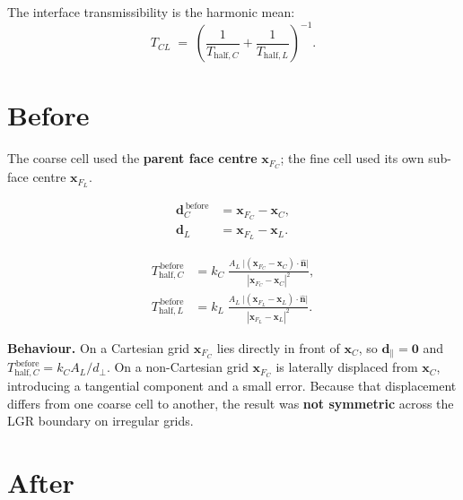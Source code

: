 \documentclass[11pt,a4paper]{article}
\begin{document}
The interface transmissibility is the harmonic mean:
\begin{equation}
  T_{CL} \;=\;
  \left(\frac{1}{T_{\mathrm{half},C}}+\frac{1}{T_{\mathrm{half},L}}\right)^{-1}.
\end{equation}

\section*{Before}

The coarse cell used the \textbf{parent face centre} $\mathbf{x}_{F_C}$;
the fine cell used its own sub-face centre $\mathbf{x}_{F_L}$.

\begin{align}
  \mathbf{d}_C^{\,\text{before}} &= \mathbf{x}_{F_C} - \mathbf{x}_C, \\[6pt]
  \mathbf{d}_L                   &= \mathbf{x}_{F_L} - \mathbf{x}_L.
\end{align}

\begin{align}
  T_{\mathrm{half},C}^{\,\text{before}}
    &= k_C\;\frac{A_L\;\bigl|(\mathbf{x}_{F_C}-\mathbf{x}_C)
                              \cdot\hat{\mathbf{n}}\bigr|}
                 {|\mathbf{x}_{F_C}-\mathbf{x}_C|^{2}},
    \label{eq:Tbefore_C}\\[10pt]
  T_{\mathrm{half},L}^{\,\text{before}}
    &= k_L\;\frac{A_L\;\bigl|(\mathbf{x}_{F_L}-\mathbf{x}_L)
                              \cdot\hat{\mathbf{n}}\bigr|}
                 {|\mathbf{x}_{F_L}-\mathbf{x}_L|^{2}}.
    \label{eq:Tbefore_L}
\end{align}

\medskip
\noindent\textbf{Behaviour.}
On a Cartesian grid $\mathbf{x}_{F_C}$ lies directly in front of
$\mathbf{x}_C$, so $\mathbf{d}_\parallel = \mathbf{0}$ and
$T_{\mathrm{half},C}^{\,\text{before}} = k_C A_L / d_\perp$.
On a non-Cartesian grid $\mathbf{x}_{F_C}$ is laterally displaced from
$\mathbf{x}_C$, introducing a tangential component and a small error.
Because that displacement differs from one coarse cell to another, the
result was \textbf{not symmetric} across the LGR boundary on irregular
grids.

\section*{After}
\end{document}
